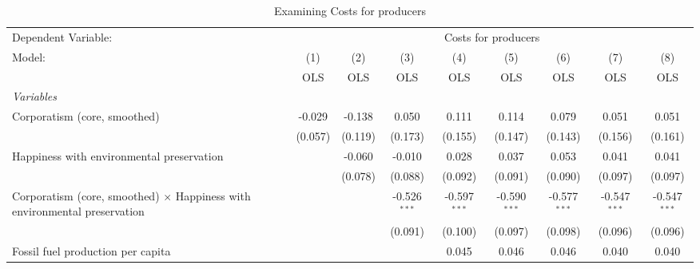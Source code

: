 
\begin{table}[htbp]
   \caption{Examining Costs for producers}
   \centering
   \begin{tabular}{lcccccccc}
      \toprule
      Dependent Variable: & \multicolumn{8}{c}{Costs for producers}\\
      Model:                                                                           & (1)     & (2)     & (3)            & (4)            & (5)            & (6)            & (7)            & (8)\\  
                                                                                       &  OLS    & OLS     & OLS            & OLS            & OLS            & OLS            & OLS            & OLS\\  
      \midrule
      \emph{Variables}\\
      Corporatism (core, smoothed)                                                     & -0.029  & -0.138  & 0.050          & 0.111          & 0.114          & 0.079          & 0.051          & 0.051\\   
                                                                                       & (0.057) & (0.119) & (0.173)        & (0.155)        & (0.147)        & (0.143)        & (0.156)        & (0.161)\\   
      Happiness with environmental preservation                                        &         & -0.060  & -0.010         & 0.028          & 0.037          & 0.053          & 0.041          & 0.041\\   
                                                                                       &         & (0.078) & (0.088)        & (0.092)        & (0.091)        & (0.090)        & (0.097)        & (0.097)\\   
      Corporatism (core, smoothed) $\times$ Happiness with environmental preservation  &         &         & -0.526$^{***}$ & -0.597$^{***}$ & -0.590$^{***}$ & -0.577$^{***}$ & -0.547$^{***}$ & -0.547$^{***}$\\   
                                                                                       &         &         & (0.091)        & (0.100)        & (0.097)        & (0.098)        & (0.096)        & (0.096)\\   
      Fossil fuel production per capita                                                &         &         &                & 0.045          & 0.046          & 0.046          & 0.040          & 0.040\\   

\end{tabular}
\end{table}
